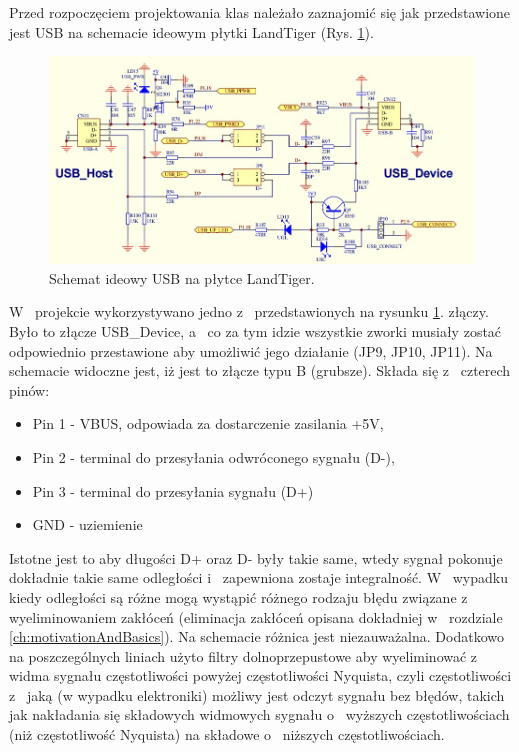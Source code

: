 \documentclass{BscUS}
\newcommand\blankpage{%
    \null
    \thispagestyle{empty}%
    \newpage}
\begin{document}
Przed rozpoczęciem projektowania klas należało zaznajomić się jak przedstawione jest USB na schemacie ideowym płytki LandTiger (Rys. \ref{fig:usbSchema}).
\begin{figure}[H]
\centering
\includegraphics[width=1\textwidth]{./img/usbSchema}
\caption{Schemat ideowy USB na płytce LandTiger.\cite{landtigerDesc}} 
\label{fig:usbSchema}
\end{figure}
\noindent W~ projekcie wykorzystywano jedno z~ przedstawionych na rysunku \ref{fig:usbSchema}. złączy. Było to złącze USB\_Device, a~ co za tym idzie wszystkie zworki musiały zostać odpowiednio przestawione aby umożliwić jego działanie (JP9, JP10, JP11). Na schemacie widoczne jest, iż jest to złącze typu B (grubsze). Składa się z~ czterech pinów:
\begin{itemize}
\item Pin 1 - VBUS, odpowiada za dostarczenie zasilania +5V,
\item Pin 2 - terminal do przesyłania odwróconego sygnału (D-),
\item Pin 3 - terminal do przesyłania sygnału (D+)
\item GND - uziemienie
\end{itemize}
\noindent Istotne jest to aby długości D+ oraz D- były takie same, wtedy sygnał pokonuje dokładnie takie same odległości i~ zapewniona zostaje integralność. W~ wypadku kiedy odległości są różne mogą wystąpić różnego rodzaju błędu związane z~ wyeliminowaniem zakłóceń (eliminacja zakłóceń opisana dokładniej w~ rozdziale \ref{ch:motivationAndBasics}). Na schemacie różnica jest niezauważalna. Dodatkowo na poszczególnych liniach użyto filtry dolnoprzepustowe aby wyeliminować z~ widma sygnału częstotliwości powyżej częstotliwości Nyquista, czyli częstotliwości z~ jaką (w wypadku elektroniki) możliwy jest odczyt sygnału bez błędów, takich jak nakładania się składowych widmowych sygnału o~ wyższych częstotliwościach (niż częstotliwość Nyquista) na składowe o~ niższych częstotliwościach.
\end{document}

